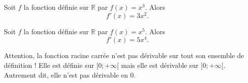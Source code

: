 \documentclass[11pt]{article}
\begin{document}
\begin{exemple}
  Soit $f$ la fonction définie sur $\mathbb{R}$ par $f(x)=x^3$. Alors
  \[
    f'(x) = 3x^2.
  \]
\end{exemple}

\begin{exemple}
  Soit $f$ la fonction définie sur $\mathbb{R}$ par $f(x)=x^5$. Alors
  \[
    f'(x) = 5x^4.
  \]
\end{exemple}

\begin{rmq}
  Attention, la fonction racine carrée n'est pas dérivable sur tout son ensemble
  de définition ! Elle est définie sur $[0;+\infty[$ mais elle est dérivable sur
  $]0;+\infty[$. Autrement dit, elle n'est pas dérivable en $0$.
\end{rmq}
\end{document}
